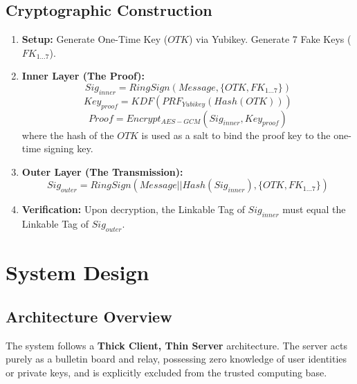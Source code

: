 \documentclass[letterpaper,11pt]{article}
\begin{document}
\subsection{Cryptographic Construction}
\begin{enumerate}
    \item \textbf{Setup:} Generate One-Time Key ($OTK$) via Yubikey. Generate 7 Fake Keys ($FK_{1...7}$).
    \item \textbf{Inner Layer (The Proof):}
    $$ Sig_{inner} = RingSign(Message, \{OTK, FK_{1...7}\}) $$
    $$ Key_{proof} = KDF(PRF_{Yubikey}(Hash(OTK))) $$
    $$ Proof = Encrypt_{AES-GCM}(Sig_{inner}, Key_{proof}) $$
    where the hash of the $OTK$ is used as a salt to bind the proof key to the one-time signing key.
    \item \textbf{Outer Layer (The Transmission):}
    $$ Sig_{outer} = RingSign(Message || Hash(Sig_{inner}), \{OTK, FK_{1...7}\}) $$
    \item \textbf{Verification:} Upon decryption, the Linkable Tag of $Sig_{inner}$ must equal the Linkable Tag of $Sig_{outer}$.
\end{enumerate}

\section{System Design}

\subsection{Architecture Overview}
The system follows a \textbf{Thick Client, Thin Server} architecture. The server acts purely as a bulletin board and relay, possessing zero knowledge of user identities or private keys, and is explicitly excluded from the trusted computing base.
\end{document}
